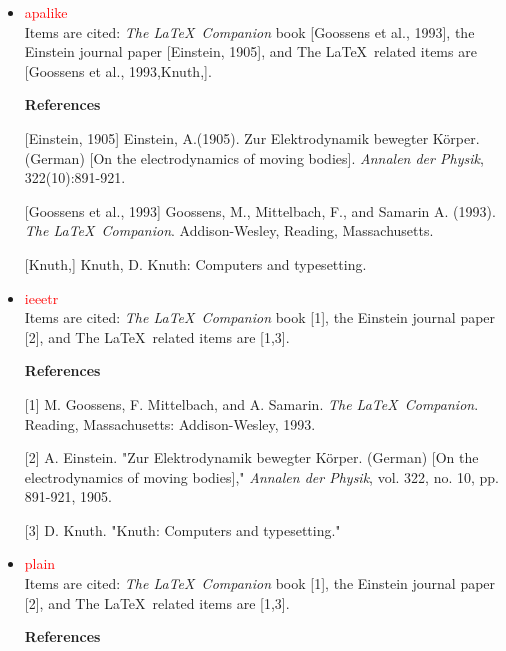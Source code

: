 \begin{itemize}
\textbf{References}

[Ein05]~~~Albert Einstein. Zur Elektrodynamik bewegter K\"{o}rper. (German) [On the electrodynamics of moving bodies]. \textit{Annalen der Physik}, 322(10):891-921, 1905.

[GMS93] Michel Goossens, Frank Mittelbach, and Alexander Samarin. \textit{The \LaTeX~Companion}. Addison-Wesley, Reading, Massachusetts, 1993.

[Knu]~~~~Donald Knuth. Knuth: Computers and typesetting.

\item \textcolor{red}{apalike}\\
Items are cited: \textit{The \LaTeX~Companion} book [Goossens et al., 1993], the Einstein journal paper [Einstein, 1905], and The \LaTeX~related items are [Goossens et al., 1993,Knuth,].

\textbf{References}

[Einstein, 1905] Einstein, A.(1905). Zur Elektrodynamik bewegter K\"{o}rper. (German) [On the electrodynamics of moving bodies]. \textit{Annalen der Physik}, 322(10):891-921.

[Goossens et al., 1993] Goossens, M., Mittelbach, F., and Samarin A. (1993). \textit{The \LaTeX~Companion}. Addison-Wesley, Reading, Massachusetts.

[Knuth,] Knuth, D. Knuth: Computers and typesetting.

\item \textcolor{red}{ieeetr}\\
Items are cited: \textit{The \LaTeX~Companion} book [1], the Einstein journal paper [2], and The \LaTeX~related items are [1,3].

\textbf{References} 

[1] M. Goossens, F. Mittelbach, and A. Samarin. \textit{The \LaTeX~Companion}. Reading, Massachusetts: Addison-Wesley, 1993.

[2] A. Einstein. "Zur Elektrodynamik bewegter K\"{o}rper. (German) [On the electrodynamics of moving bodies]," \textit{Annalen der Physik}, vol. 322, no. 10, pp. 891-921, 1905.

[3] D. Knuth. "Knuth: Computers and typesetting."

\item \textcolor{red}{plain}\\
Items are cited: \textit{The \LaTeX~Companion} book [1], the Einstein journal paper [2], and The \LaTeX~related items are [1,3].

\textbf{References} 


\end{itemize}
